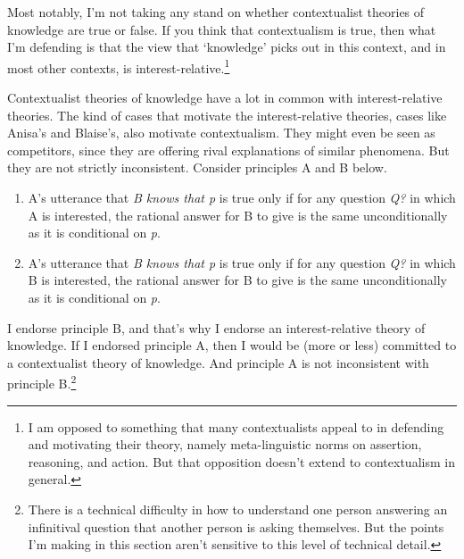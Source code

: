 \documentclass[
  11pt,
]{book}
\providecommand{\tightlist}{%
  \setlength{\itemsep}{0pt}\setlength{\parskip}{0pt}}
\begin{document}
Most notably, I'm not taking any stand on whether contextualist theories of knowledge are true or false. If you think that contextualism is true, then what I'm defending is that the view that `knowledge' picks out in this context, and in most other contexts, is interest-relative.\footnote{I am opposed to something that many contextualists appeal to in defending and motivating their theory, namely meta-linguistic norms on assertion, reasoning, and action. But that opposition doesn't extend to contextualism in general.}

Contextualist theories of knowledge have a lot in common with interest-relative theories. The kind of cases that motivate the interest-relative theories, cases like Anisa's and Blaise's, also motivate contextualism. They might even be seen as competitors, since they are offering rival explanations of similar phenomena. But they are not strictly inconsistent. Consider principles A and B below.

\begin{enumerate}
\def\labelenumi{\Alph{enumi}.}
\tightlist
\item
  A's utterance that \emph{B knows that p} is true only if for any question \emph{Q?} in which A is interested, the rational answer for B to give is the same unconditionally as it is conditional on \emph{p}.
\item
  A's utterance that \emph{B knows that p} is true only if for any question \emph{Q?} in which B is interested, the rational answer for B to give is the same unconditionally as it is conditional on \emph{p}.
\end{enumerate}

I endorse principle B, and that's why I endorse an interest-relative theory of knowledge. If I endorsed principle A, then I would be (more or less) committed to a contextualist theory of knowledge. And principle A is not inconsistent with principle B.\footnote{There is a technical difficulty in how to understand one person answering an infinitival question that another person is asking themselves. But the points I'm making in this section aren't sensitive to this level of technical detail.}
\end{document}
